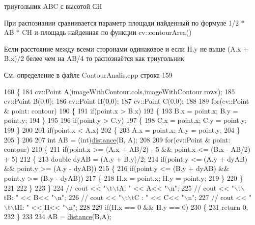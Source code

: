 триугольник A\+B\+C с высотой С\+H

При распознании сравнивается параметр площади найденный по формуле 1/2 $\ast$ A\+B $\ast$ C\+H и площадь найденная по функции cv\+::contour\+Area()

Если расстояние между всеми сторонами одинаковое и если H.\+y не выше (A.\+x + B.\+x)/2 белее чем на A\+B/4 то распознаётся как триугольник

См. определение в файле Contour\+Analis.\+cpp строка 159


\begin{DoxyCode}
160 \{
184     cv::Point A(imageWithContour.cols,imageWithContour.rows);
185     cv::Point B(0,0);
186     cv::Point H(0,0);
187     cv::Point C(0,0);
188 
189     \textcolor{keywordflow}{for}(cv::Point & point: contour)
190     \{
191         \textcolor{keywordflow}{if}(point.x > B.x)
192         \{
193             B.x = point.x; B.y = point.y;
194         \}
195 
196         \textcolor{keywordflow}{if}(point.y > C.y)
197         \{
198             C.x = point.x; C.y = point.y;
199         \}
200 
201         \textcolor{keywordflow}{if}(point.x < A.x)
202         \{
203             A.x = point.x; A.y = point.y;
204         \}
205     \}
206 
207     \textcolor{keywordtype}{int} AB = (int)\hyperlink{class_contour_analis_a4f99f88069c6a746805275d21acdf5b2}{distance}(B, A);
208 
209     \textcolor{keywordflow}{for}(cv::Point & point: contour)
210     \{
211         \textcolor{keywordflow}{if}(point.x >= (A.x + AB/2) - 5 && point.x <= (B.x - AB/2) + 5)
212         \{
213             \textcolor{keywordtype}{double} dyAB = (A.y + B.y)/2;
214             \textcolor{keywordflow}{if}(point.y <= (A.y + dyAB) && point.y >= (A.y - dyAB))
215             \{
216                 \textcolor{keywordflow}{if}(point.y <= (B.y + dyAB) && point.y >= (B.y - dyAB))
217                 \{
218                    H.x = point.x; H.y = point.y;
219                 \}
220             \}
221 
222         \}
223     \}
224 \textcolor{comment}{//    cout << "\(\backslash\)t\(\backslash\)tA: " << A<< "\(\backslash\)n";}
225 \textcolor{comment}{//    cout << "\(\backslash\)t\(\backslash\)tB: " << B<< "\(\backslash\)n";}
226 \textcolor{comment}{//    cout << "\(\backslash\)t\(\backslash\)tC : " << C<< "\(\backslash\)n";}
227 \textcolor{comment}{//    cout << "\(\backslash\)t\(\backslash\)tH: " << H<< "\(\backslash\)n";}
228 
229     \textcolor{keywordflow}{if}(H.x == 0 && H.y == 0)
230     \{
231         \textcolor{keywordflow}{return} 0;
232     \}
233 
234     AB = \hyperlink{class_contour_analis_a4f99f88069c6a746805275d21acdf5b2}{distance}(B,A);

\end{DoxyCode}
